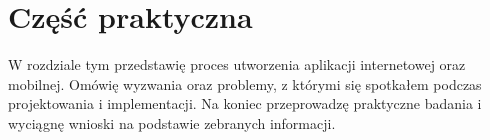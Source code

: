 \chapter{Część praktyczna}
W rozdziale tym przedstawię proces utworzenia aplikacji internetowej oraz mobilnej. Omówię wyzwania oraz problemy, z którymi się spotkałem podczas projektowania i implementacji. Na koniec przeprowadzę praktyczne badania i wyciągnę wnioski na podstawie zebranych informacji.
